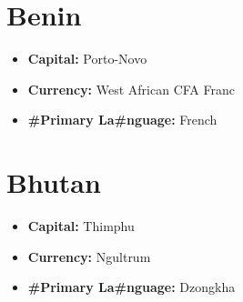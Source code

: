 \documentclass[a4paper,twoside]{book}
\begin{document}
\section*{\Huge Benin}
\vspace{5mm} %
\begin{itemize}
	\item \textbf{Capital:} Porto-Novo
	\item \textbf{Currency:} West African CFA Franc
	\item \textbf{\#Primary La\#nguage:} French
\end{itemize}

\section*{\Huge Bhutan}
\vspace{5mm} %
\begin{itemize}
	\item \textbf{Capital:} Thimphu
	\item \textbf{Currency:} Ngultrum
	\item \textbf{\#Primary La\#nguage:} Dzongkha
\end{itemize}
\end{document}
